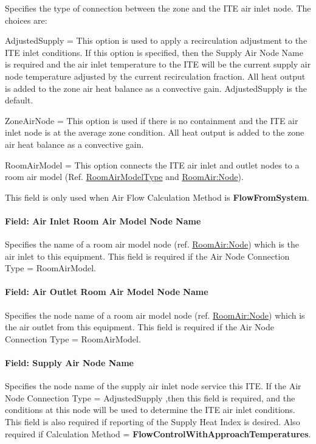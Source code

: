 Specifies the type of connection between the zone and the ITE air inlet node. The choices are:

AdjustedSupply = This option is used to apply a recirculation adjustment to the ITE inlet conditions. If this option is specified, then the Supply Air Node Name is required and the air inlet temperature to the ITE will be the current supply air node temperature adjusted by the current recirculation fraction. All heat output is added to the zone air heat balance as a convective gain. AdjustedSupply is the default.

ZoneAirNode = This option is used if there is no containment and the ITE air inlet node is at the average zone condition. All heat output is added to the zone air heat balance as a convective gain.

RoomAirModel = This option connects the ITE air inlet and outlet nodes to a room air model (Ref. \hyperref[roomairmodeltype]{RoomAirModelType} and \hyperref[roomairnode]{RoomAir:Node}).

This field is only used when Air Flow Calculation Method is \textbf{FlowFromSystem}.

\paragraph{Field: Air Inlet Room Air Model Node Name}\label{field-air-inlet-room-air-model-node-name}

Specifies the name of a room air model node (ref. \hyperref[roomairnode]{RoomAir:Node}) which is the air inlet to this equipment. This field is required if the Air Node Connection Type = RoomAirModel.

\paragraph{Field: Air Outlet Room Air Model Node Name}\label{field-air-outlet-room-air-model-node-name}

Specifies the node name of a room air model node (ref. \hyperref[roomairnode]{RoomAir:Node}) which is the air outlet from this equipment. This field is required if the Air Node Connection Type = RoomAirModel.

\paragraph{Field: Supply Air Node Name}\label{field-supply-air-node-name}

Specifies the node name of the supply air inlet node service this ITE. If the Air Node Connection Type = AdjustedSupply ,then this field is required, and the conditions at this node will be used to determine the ITE air inlet conditions. This field is also required if reporting of the Supply Heat Index is desired. Also required if Calculation Method = \textbf{FlowControlWithApproachTemperatures}.

